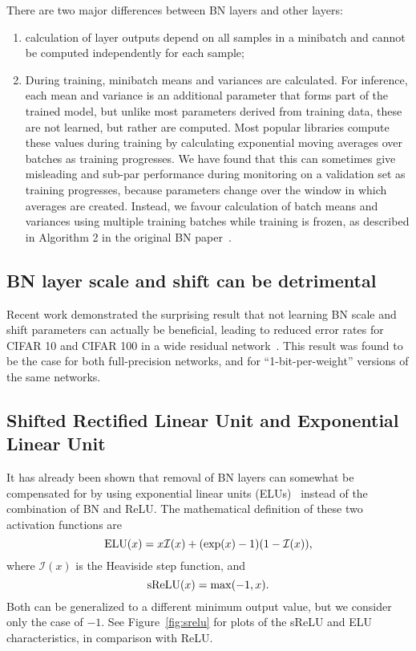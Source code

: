 \documentclass[conference]{IEEEtran}
\begin{document}
 There are two major differences between BN layers and other layers:
 \begin{enumerate}
     \item calculation of layer outputs depend on all samples in a minibatch and cannot be computed independently for each sample;
     \item During training, minibatch  means and variances are calculated. For inference, each mean and variance is an additional parameter that forms part of the trained model, but unlike most parameters derived from training data, these are not learned, but rather are computed.  Most popular libraries compute these values during training by calculating exponential moving averages over batches as training progresses. We have found that this can sometimes give misleading and sub-par performance during monitoring on a validation set as training progresses, because parameters change over the window in which averages are created. Instead, we favour calculation of batch means and variances using multiple training batches while training is frozen, as described in Algorithm 2 in the original BN paper~\cite{Ioffe.15}.
 \end{enumerate}
 
\subsection{BN layer scale and shift can be detrimental} 
 
Recent work demonstrated the surprising result that not learning BN scale and shift parameters can actually be beneficial, leading to reduced error rates for CIFAR 10 and CIFAR 100 in a wide residual network~\cite{McDonnell.18}. This result was found to be the case for both full-precision networks, and for ``1-bit-per-weight'' versions of the same networks.

\subsection{Shifted Rectified Linear Unit and Exponential Linear Unit}

It has already been shown that removal of BN layers can somewhat be compensated for by using exponential linear units (ELUs)~\cite{Clevert.15} instead of the combination of BN and ReLU. The mathematical definition of these two activation functions are
\begin{equation}
    {\rm ELU}(x) = x\mathcal{I}(x)+(\exp(x)-1)(1-\mathcal{I}(x)),
\end{equation}
where $\mathcal{I}(x)$ is the Heaviside step function,
and
\begin{equation}
    {\rm sReLU}(x) = {\rm max}(-1,x).
\end{equation}
Both can be generalized to a different minimum output value, but we consider only the case of $-1$. See Figure~\ref{fig:srelu} for plots of the sReLU and ELU characteristics, in comparison with ReLU.
\end{document}
